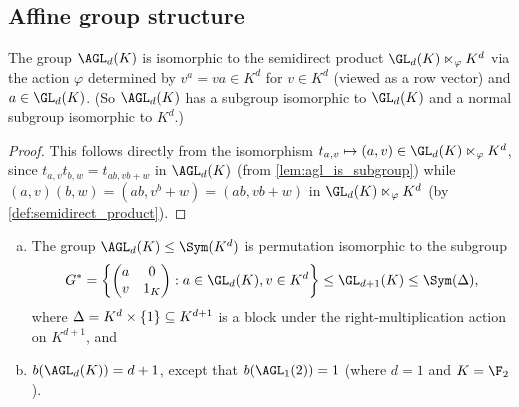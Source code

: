 \subsection{Affine group structure}

\begin{proposition}\label{prop:agl_is_semidirect_product}
    The group $\AGL_d(K)$ is isomorphic to the semidirect product $\GL_d(K) \ltimes_\varphi K^d$ via the action $\varphi$ determined by $v^a = va \in K^d$ for $v \in K^d$ (viewed as a row vector) and $a \in \GL_d(K)$. (So $\AGL_d(K)$ has a subgroup isomorphic to $\GL_d(K)$ and a normal subgroup isomorphic to $K^d$.)
\end{proposition}

\begin{proof}
    This follows directly from the isomorphism $t_{a,v} \mapsto (a,v) \in \GL_d(K) \ltimes_\varphi K^d$, since $t_{a,v} t_{b,w} = t_{ab,vb+w}$ in $\AGL_d(K)$ (from \autoref{lem:agl_is_subgroup}) while $(a,v)(b,w) = (ab,v^b+w) = (ab,vb + w)$ in $\GL_d(K) \ltimes_\varphi K^d$ (by \autoref{def:semidirect_product}).
\end{proof}

\begin{proposition}\label{prop:agl_as_subgrp_of_gl}
    \begin{enumerate}[(a)]
        \item The group $\AGL_d(K) \leq \Sym(K^d)$ is permutation isomorphic to the subgroup
              $$G^* = \left\{
                  \begin{pmatrix}
                      a & 0   \\
                      v & 1_K
                  \end{pmatrix} : a \in \GL_d(K),v \in K^d\right\} \leq \GL_{d+1}(K) \leq \Sym(\Delta),$$
              where $\Delta = K^d \times \added{3}{\{1\}} \subseteq K^{d+1}$ is a block under the right-multiplication action  on $K^{d+1}$, and
        \item $b(\AGL_d(K)) = d + 1$, except that $b(\AGL_1(2)) = 1$ (where $d = 1$ and $K = \F_2$).
    \end{enumerate}
\end{proposition}

